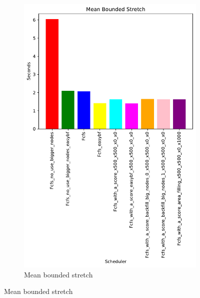 \documentclass[a4paper]{article}
\begin{document}
\begin{figure}[H]
\begin{subfigure}[b]{0.4\linewidth}\centering\includegraphics[width=1\linewidth]{MBSS/plot/Results_Size_And_Data_2022-01-24->2022-01-24_Mean_Stretch_With_a_Minimum_162_128_162_256_162_1024.pdf}\caption{Mean bounded stretch}\label{23}\end{subfigure}

\end{figure}
\end{document}
